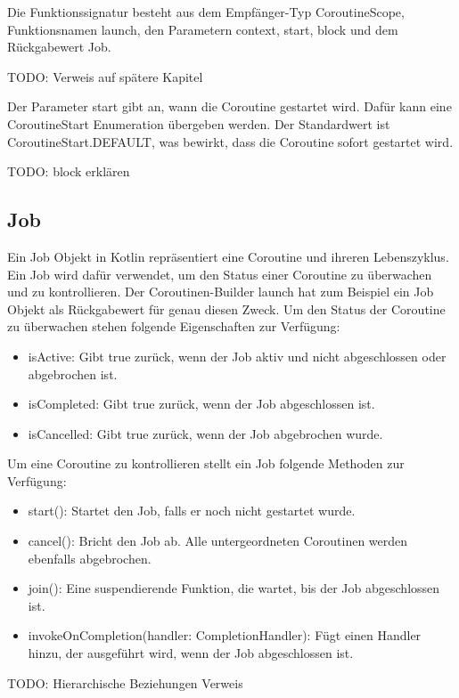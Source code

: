 \documentclass[fontsize=12pt,paper=a4,twoside=semi,parskip=half-,headsepline,headinclude]{scrreprt}
\begin{document}
Die Funktionssignatur besteht aus dem Empfänger-Typ CoroutineScope, Funktionsnamen launch, den Parametern context, start, block und dem Rückgabewert Job.

TODO: Verweis auf spätere Kapitel

Der Parameter start gibt an, wann die Coroutine gestartet wird. Dafür kann eine CoroutineStart Enumeration übergeben werden. Der Standardwert ist CoroutineStart.DEFAULT, was bewirkt, dass die Coroutine sofort gestartet wird.

TODO: block erklären 

\subsection{Job}

Ein Job Objekt in Kotlin repräsentiert eine Coroutine und ihreren Lebenszyklus. Ein Job wird dafür verwendet, um den Status einer Coroutine zu überwachen und zu kontrollieren. Der Coroutinen-Builder launch hat zum Beispiel ein Job Objekt als Rückgabewert für genau diesen Zweck. Um den Status der Coroutine zu überwachen stehen folgende Eigenschaften zur Verfügung:

\begin{itemize}
	\item isActive: Gibt true zurück, wenn der Job aktiv und nicht abgeschlossen oder abgebrochen ist.
	\item isCompleted: Gibt true zurück, wenn der Job abgeschlossen ist.
	\item isCancelled: Gibt true zurück, wenn der Job abgebrochen wurde.
\end{itemize}

Um eine Coroutine zu kontrollieren stellt ein Job folgende Methoden zur Verfügung:

\begin{itemize}
	\item start(): Startet den Job, falls er noch nicht gestartet wurde.
	\item cancel(): Bricht den Job ab. Alle untergeordneten Coroutinen werden ebenfalls abgebrochen.
	\item join(): Eine suspendierende Funktion, die wartet, bis der Job abgeschlossen ist.
	\item invokeOnCompletion(handler: CompletionHandler): Fügt einen Handler hinzu, der ausgeführt wird, wenn der Job abgeschlossen ist.
\end{itemize}

TODO: Hierarchische Beziehungen Verweis
\end{document}
